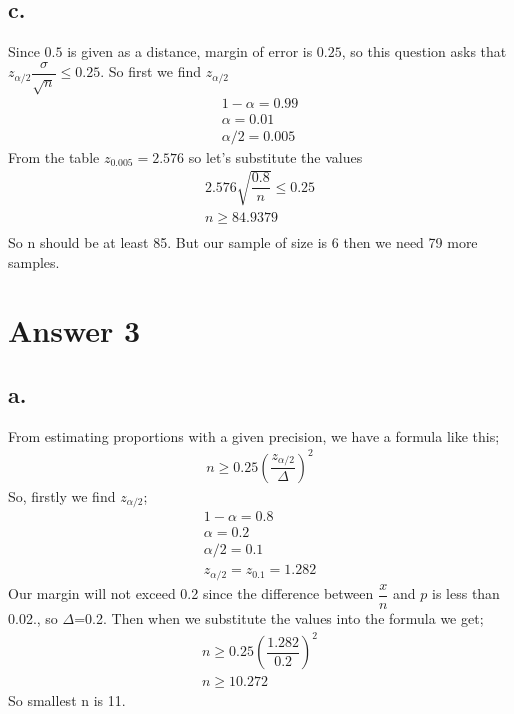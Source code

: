 \documentclass[12pt]{article}
\begin{document}
\subsection*{c.}
Since $0.5$ is given as a distance, margin of error is $0.25$, so this question asks that $z_{\alpha/2} \dfrac{\sigma}{\sqrt{n}} \leq 0.25$. So first we find $z_{\alpha/2}$
\begin{gather*}
     1 - \alpha = 0.99 \\
    \alpha = 0.01 \\
    \alpha / 2 = 0.005
\end{gather*}
From the table $z_{0.005}= 2.576$ so let's substitute the values
\begin{gather*}
    2.576 \sqrt{\dfrac{0.8}{n}} \leq 0.25 \\
    n \geq 84.9379 \\
\end{gather*}
So n should be at least 85. But our sample of size is 6 then we need 79 more samples.
\section*{Answer 3}

\subsection*{a.}
From estimating proportions with a given precision, we have a formula like this;
\begin{gather*}
    n \geq 0.25(\dfrac{z_{\alpha/2}}{\Delta})^2
\end{gather*}
So, firstly we find $z_{\alpha/2}$;
\begin{gather*}
    1- \alpha = 0.8 \\
    \alpha = 0.2 \\
    \alpha/2 = 0.1 \\
    z_{\alpha/2} = z_{0.1} = 1.282
\end{gather*}
Our margin will not exceed 0.2 since the difference
between $\dfrac{x}{n}$ and $p$ is less than 0.02., so $\Delta$=0.2. Then when we substitute the values into the formula we get;
\begin{gather*}
    n \geq 0.25 (\dfrac{1.282}{0.2})^2 \\
    n \geq 10.272
\end{gather*}
So smallest n is 11.
\end{document}
